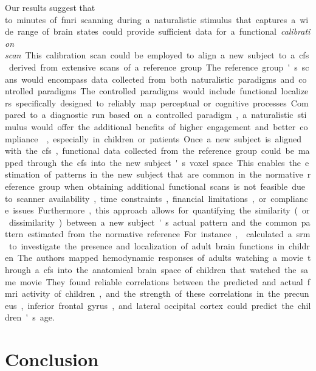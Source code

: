 
%
Our results suggest that \unit[15] to \unit[30]{minutes} of \ac{fmri} scanning
during a naturalistic stimulus that captures a wide range of brain states could
provide sufficient data for a functional \textit{calibration scan}.
%
This calibration scan could be employed to align a new subject to a \ac{cfs}
derived from extensive scans of a reference group.
%
The reference group's scans would encompass data collected from both
naturalistic paradigms and controlled paradigms.
%
The controlled paradigms would include functional localizers specifically
designed to reliably map perceptual or cognitive processes.
%
Compared to a diagnostic run based on a controlled paradigm, a naturalistic
stimulus would offer the additional benefits of higher engagement and better
compliance \citep{vanderwal2015inscapes, eickhoff2020towards}, especially in
children or patients.
%
Once a new subject is aligned with the \ac{cfs}, functional data collected from
the reference group could be mapped through the \ac{cfs} into the new subject's
voxel space.
%
This enables the estimation of patterns in the new subject that are common in
the normative reference group when obtaining additional functional scans is not
feasible due to scanner availability, time constraints, financial limitations,
or compliance issues.
%
Furthermore, this approach allows for quantifying the similarity (or
dissimilarity) between a new subject's actual pattern and the common pattern
estimated from the normative reference.
%
For instance, \citet{yates2021emergence} calculated a \ac{srm} to investigate
the presence and localization of adult brain functions in children.
%
The authors mapped hemodynamic responses of adults watching a movie through a
\ac{cfs} into the anatomical brain space of children that watched the same
movie.
%
They found reliable correlations between the predicted and actual \ac{fmri}
activity of children, and the strength of these correlations in the precuneus,
inferior frontal gyrus, and lateral occipital cortex could predict the
children's age.



\section{Conclusion}

